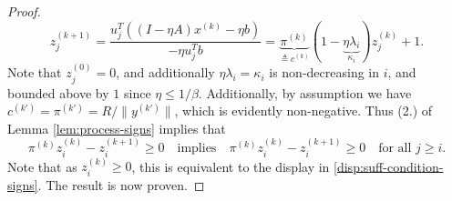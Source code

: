 \documentclass[11pt]{article}
\begin{document}
\begin{proof}
  \[
  z^{(k+1)}_j = \frac{u_j^T((I - \eta A) x^{(k)} - \eta b)}{-\eta u_j^Tb} = \underbrace{\pi^{(k)}}_{\triangleq c^{(k)}}(1 - \underbrace{\eta \lambda_i}_{\kappa_i})
  z_j^{(k)} + 1. 
  \]
  Note that $z^{(0)}_j = 0$, and additionally $\eta \lambda_i = \kappa_i$ is non-decreasing in $i$, and bounded above by $1$ since $\eta \leq 1/\beta$. Additionally,
  by assumption we have $c^{(k')} = \pi^{(k')} = R/\|y^{(k')}\|$, which is evidently non-negative. Thus (2.) of
  Lemma \ref{lem:process-signs} implies that
  \[
  \pi^{(k)}z_i^{(k)} - z_i^{(k + 1)} \geq 0 \quad \text{implies} \quad \pi^{(k)}z_i^{(k)} - z_i^{(k + 1)} \geq 0 \quad \text{for all $j \geq i$.} 
  \]
  Note that as $z_i^{(k)} \geq 0$, this is equivalent to the display in \eqref{disp:suff-condition-signs}. The result is now proven.
\end{proof}
\end{document}
